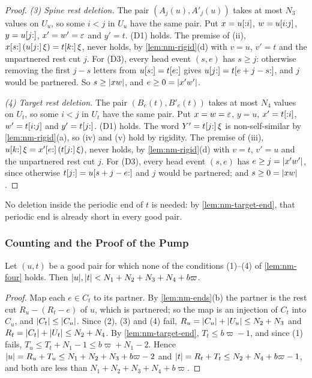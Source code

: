 \begin{proof}
\emph{(3) Spine rest deletion.} The pair $(A_j(u),A'_j(u))$ takes at most
$N_3$ values on $U_u$, so some $i<j$ in $U_u$ have the same pair. Put
$x=u[{:}i]$, $w=u[i{:}j]$, $y=u[j{:}]$, $x'=w'=\varepsilon$ and $y'=t$. (D1) holds.
The premise of (ii), $x[s{:}]\,(u[j{:}]\,\xi)=t[k{:}]\,\xi$, never holds, by
\cref{lem:nm-rigid}(d) with $v=u$, $v'=t$ and the unpartnered rest cut $j$. For
(D3), every head event $(s,e)$ has $s\ge j$: otherwise removing the first $j-s$
letters from $u[s{:}]=t[e{:}]$ gives $u[j{:}]=t[e+j-s{:}]$, and $j$ would
be partnered. So $s\ge\lvert xw\rvert$, and $e\ge0=\lvert x'w'\rvert$.

\emph{(4) Target rest deletion.} The pair $(B_e(t),B'_e(t))$ takes at most
$N_4$ values on $U_t$, so some $i<j$ in $U_t$ have the same pair. Put
$x=w=\varepsilon$, $y=u$, $x'=t[{:}i]$, $w'=t[i{:}j]$ and $y'=t[j{:}]$. (D1) holds.
The word $Y'=t[j{:}]\,\xi$ is non-self-similar by \cref{lem:nm-rigid}(a), so
(iv) and (v) hold by rigidity. The premise of (iii),
$u[k{:}]\,\xi=x'[e{:}]\,(t[j{:}]\,\xi)$, never holds, by
\cref{lem:nm-rigid}(d) with $v=t$, $v'=u$ and the unpartnered rest cut $j$. For
(D3), every head event $(s,e)$ has $e\ge j=\lvert x'w'\rvert$, since otherwise
$t[j{:}]=u[s+j-e{:}]$ and $j$ would be partnered; and $s\ge0=\lvert xw\rvert$.
\end{proof}

No deletion inside the periodic end of $t$ is needed: by
\cref{lem:nm-target-end}, that periodic end is already short in every good
pair.

\subsubsection{Counting and the Proof of the Pump}

\begin{lemma}[Counting]\label{lem:nm-count}
Let $(u,t)$ be a good pair for which none of the conditions \textup{(1)--(4)}
of \cref{lem:nm-four} holds. Then
$\lvert u\rvert,\lvert t\rvert<N_1+N_2+N_3+N_4+b\varpi$.
\end{lemma}

\begin{proof}
Map each $e\in C_t$ to its partner. By \cref{lem:nm-ends}(b) the partner is the
rest cut $R_u-(R_t-e)$ of $u$, which is partnered; so the map is an
injection of $C_t$ into $C_u$, and $\lvert C_t\rvert\le\lvert C_u\rvert$. Since (2), (3) and
(4) fail, $R_u=\lvert C_u\rvert+\lvert U_u\rvert\le N_2+N_3$ and
$R_t=\lvert C_t\rvert+\lvert U_t\rvert\le N_2+N_4$. By \cref{lem:nm-target-end},
$T_t\le b\varpi-1$, and since (1) fails, $T_u\le T_t+N_1-1\le b\varpi+N_1-2$.
Hence $\lvert u\rvert=R_u+T_u\le N_1+N_2+N_3+b\varpi-2$ and
$\lvert t\rvert=R_t+T_t\le N_2+N_4+b\varpi-1$, and both are less than
$N_1+N_2+N_3+N_4+b\varpi$.
\end{proof}


